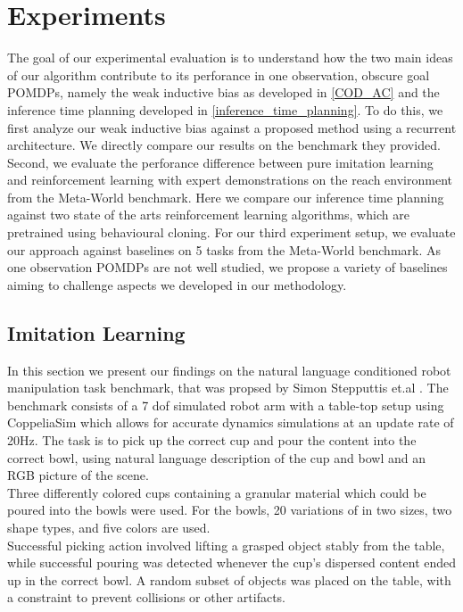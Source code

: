 
\chapter{Experiments}
\label{chapter:Experiments}
The goal of our experimental evaluation is to understand how the two main ideas of our algorithm contribute to its perforance in one observation, obscure goal 
POMDPs, namely the weak inductive bias as developed in \ref{COD_AC} and the inference time planning developed in \ref{inference_time_planning}. 
To do this, we first analyze our weak inductive bias against a proposed method using a recurrent architecture. 
We directly compare our results on the benchmark they provided. Second, we evaluate the perforance difference between pure imitation learning and reinforcement 
learning with expert demonstrations on the reach environment from the Meta-World benchmark. Here we compare our inference time planning against two state of 
the arts reinforcement learning algorithms, which are pretrained using behavioural cloning. For our third experiment setup, we evaluate our approach against 
baselines on 5 tasks from the Meta-World benchmark. As one observation POMDPs are not well studied, we propose a variety of  
baselines aiming to challenge aspects we developed in our methodology.


\section{Imitation Learning}
\label{sec:imi_learning}
In this section we present our findings on the natural language conditioned robot manipulation task benchmark, that was propsed by Simon Stepputtis et.al 
\cite{stepputtis2020languageconditioned}. The benchmark consists of a 7 dof simulated robot arm with a table-top setup using CoppeliaSim which allows 
for accurate dynamics simulations at an update rate of 20Hz. The task is to pick up the correct cup and pour the content into the correct bowl, using 
natural language description of the cup and bowl and an RGB picture of the scene.\\
Three differently colored cups containing a granular material which could be poured into the bowls were used. For the bowls, 20 variations of in two sizes, 
two shape types, and five colors are used.\\
Successful picking action involved lifting a grasped object stably from the table, while successful pouring was detected whenever the cup's dispersed 
content ended up in the correct bowl. A random subset of objects was placed on the table, with a constraint to prevent collisions or other artifacts. 

